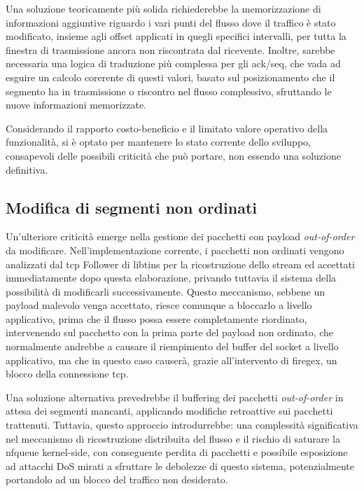 Una soluzione teoricamente più solida richiederebbe la memorizzazione di informazioni aggiuntive riguardo i vari punti del flusso dove il traffico è stato modificato, insieme agli offset applicati in quegli specifici intervalli, per tutta la finestra di trasmissione ancora non riscontrata dal ricevente. Inoltre, sarebbe necessaria una logica di traduzione più complessa per gli \gls{ack}/\gls{seq}, che vada ad esguire un calcolo corerente di questi valori, basato sul posizionamento che il segmento ha in trasmissione o riscontro nel flusso complessivo, sfruttando le nuove informazioni memorizzate.

Considerando il rapporto costo-beneficio e il limitato valore operativo della funzionalità, si è optato per mantenere lo stato corrente dello sviluppo, consapevoli delle possibili criticità che può portare, non essendo una soluzione definitiva.

\subsection{Modifica di segmenti non ordinati}

Un'ulteriore criticità emerge nella gestione dei pacchetti con payload \textit{out-of-order} da modificare. Nell'implementazione corrente, i pacchetti non ordinati vengono analizzati dal \gls{tcp} Follower di libtins per la ricostruzione dello stream ed accettati immediatamente dopo questa elaborazione, privando tuttavia il sistema della possibilità di modificarli successivamente. Questo meccanismo, sebbene un payload malevolo venga accettato, riesce comunque a bloccarlo a livello applicativo, prima che il flusso possa essere completamente riordinato, intervenendo sul pacchetto con la prima parte del payload non ordinato, che normalmente andrebbe a causare il riempimento del buffer del socket a livello applicativo, ma che in questo caso causerà, grazie all'intervento di firegex, un blocco della connessione \gls{tcp}.

Una soluzione alternativa prevedrebbe il buffering dei pacchetti \textit{out-of-order} in attesa dei segmenti mancanti, applicando modifiche retroattive sui pacchetti trattenuti. Tuttavia, questo approccio introdurrebbe: una complessità significativa nel meccanismo di ricostruzione distribuita del flusso e il rischio di saturare la \gls{nfqueue} kernel-side, con conseguente perdita di pacchetti e possibile esposizione ad attacchi DoS mirati a sfruttare le debolezze di questo sistema, potenzialmente portandolo ad un blocco del traffico non desiderato.


